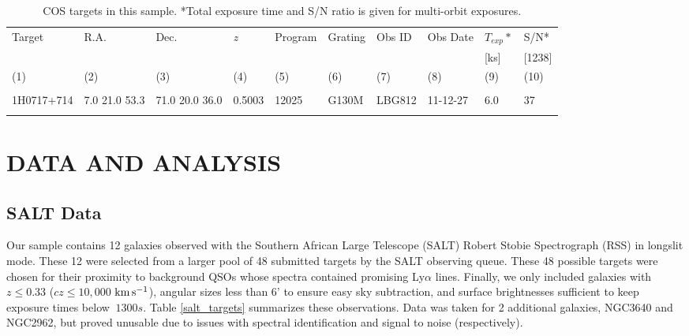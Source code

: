 \documentclass[iop]{emulateapj-rtx4}
\newcommand{\kms}{$\rm km\, s^{-1}$}
\begin{document}
\begin{table}[ht]\footnotesize
\begin{center}
\begin{tabular}{l l l l l l l l l l}
 \hline \hline
  Target 		& R.A. 		& Dec. 		& \textit{z}		 & Program 	  & Grating 	  & Obs ID 	    & Obs Date 	    & $T_{exp}*$     & S/N*  \\ 
  	    		& 	       		&	  		& 		  	 & 		    	  & 		  	  & 		  	   & 		     	    & 	        [ks]        & [1238] \\ 
 \scriptsize (1)  & \scriptsize (2) & \scriptsize (3) & \scriptsize (4) & \scriptsize (5) & \scriptsize (6) & \scriptsize  (7) & \scriptsize (8) & \scriptsize (9) & \scriptsize (10)  \\ \hline \hline
\\
    
1H0717+714		  &  7.0  21.0   53.3  &     71.0  20.0  36.0  &    0.5003  & 12025  	    &   G130M  &   LBG812  		 & 11-12-27      	 	  &  6.0    &      37         \\

 \\
\hline

\end{tabular}
\end{center}
  \caption{\small{COS targets in this sample. *Total exposure time and S/N ratio is given for multi-orbit exposures.}}
  \label{target_table}
\end{table}


\section{DATA AND ANALYSIS}

\subsection{SALT Data}
Our sample contains 12 galaxies observed with the Southern African Large Telescope (SALT) Robert Stobie Spectrograph (RSS) in longslit mode. These 12 were selected from a larger pool of 48 submitted targets by the SALT observing queue. These 48 possible targets were chosen for their proximity to background QSOs whose spectra contained promising Ly$\alpha$ lines. Finally, we only included galaxies with $z \leq 0.33$ ($cz \leq 10,000$ \kms), angular sizes less than 6' to ensure easy sky subtraction, and surface brightnesses sufficient to keep exposure times below $~1300 s$. Table \ref{salt_targets} summarizes these observations. Data was taken for 2 additional galaxies, NGC3640 and NGC2962, but proved unusable due to issues with spectral identification and signal to noise (respectively).
\end{document}
